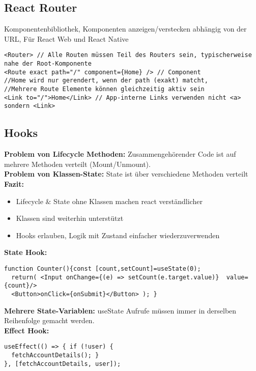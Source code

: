 \subsection{React Router}
Komponentenbibliothek, Komponenten anzeigen/verstecken abhängig von der URL, Für React Web und React Native
\begin{lstlisting}[style=htmlcssjs]
<Router> // Alle Routen müssen Teil des Routers sein, typischerweise nahe der Root-Komponente
<Route exact path="/" component={Home} /> // Component
//Home wird nur gerendert, wenn der path (exakt) matcht,
//Mehrere Route Elemente können gleichzeitig aktiv sein
<Link to="/">Home</Link> // App-interne Links verwenden nicht <a> sondern <Link>
\end{lstlisting}
\subsection{Hooks}
\textbf{Problem von Lifecycle Methoden:} Zusammengehörender Code ist auf mehrere Methoden verteilt (Mount/Unmount).\\
\textbf{Problem von Klassen-State:} State ist über verschiedene Methoden verteilt\\
\textbf{Fazit:}
\begin{itemize}[topsep=0pt, leftmargin=3mm]
  \setlength\itemsep{-0.3em}
  \item Lifecycle $\&$ State ohne Klassen machen react verständlicher
  \item Klassen sind weiterhin unterstützt
  \item Hooks erlauben, Logik mit Zustand einfacher wiederzuverwenden
\end{itemize}
\textcolor{b}{\textbf{State Hook:}}
\begin{lstlisting}[style=htmlcssjs]
function Counter(){const [count,setCount]=useState(0);
  return( <Input onChange={(e) => setCount(e.target.value)}  value={count}/>
  <Button>onClick={onSubmit}</Button> ); }
\end{lstlisting}
\textbf{Mehrere State-Variablen:} useState Aufrufe müssen immer in derselben Reihenfolge gemacht werden.\\
\textcolor{b}{\textbf{Effect Hook:}}
\begin{lstlisting}[style=htmlcssjs]
useEffect(() => { if (!user) {
  fetchAccountDetails(); }
}, [fetchAccountDetails, user]);
\end{lstlisting}
